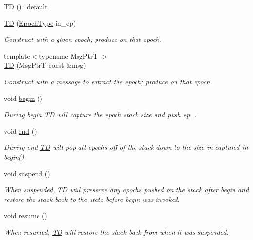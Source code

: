 \begin{DoxyCompactItemize}
\item 
\hyperlink{structvt_1_1ctx_1_1_t_d_a1cb75bb3a0803da9cc471b675aa9124e}{TD} ()=default
\item 
\hyperlink{structvt_1_1ctx_1_1_t_d_ade8d2b390d1b4a484dd9f5f20546bc91}{TD} (\hyperlink{namespacevt_a81d11b28122d43bf9834577e4a06440f}{Epoch\+Type} in\+\_\+ep)
\begin{DoxyCompactList}\small\item\em Construct with a given epoch; produce on that epoch. \end{DoxyCompactList}\item 
{\footnotesize template$<$typename Msg\+PtrT $>$ }\\\hyperlink{structvt_1_1ctx_1_1_t_d_a632c366417b95a168c345cfb17051eeb}{TD} (Msg\+PtrT const \&msg)
\begin{DoxyCompactList}\small\item\em Construct with a message to extract the epoch; produce on that epoch. \end{DoxyCompactList}\item 
void \hyperlink{structvt_1_1ctx_1_1_t_d_a1560e74cce475bbc650f03b91bf6274e}{begin} ()
\begin{DoxyCompactList}\small\item\em During begin {\ttfamily \hyperlink{structvt_1_1ctx_1_1_t_d}{TD}} will capture the epoch stack size and push {\ttfamily ep\+\_\+}. \end{DoxyCompactList}\item 
void \hyperlink{structvt_1_1ctx_1_1_t_d_a84ec814281906256db4ebc71fa2a435a}{end} ()
\begin{DoxyCompactList}\small\item\em During end {\ttfamily \hyperlink{structvt_1_1ctx_1_1_t_d}{TD}} will pop all epochs off of the stack down to the size in captured in {\ttfamily \hyperlink{structvt_1_1ctx_1_1_t_d_a1560e74cce475bbc650f03b91bf6274e}{begin()}} \end{DoxyCompactList}\item 
void \hyperlink{structvt_1_1ctx_1_1_t_d_ab66a4c01265c0c43d95d0084ea8c5ff9}{suspend} ()
\begin{DoxyCompactList}\small\item\em When suspended, {\ttfamily \hyperlink{structvt_1_1ctx_1_1_t_d}{TD}} will preserve any epochs pushed on the stack after begin and restore the stack back to the state before begin was invoked. \end{DoxyCompactList}\item 
void \hyperlink{structvt_1_1ctx_1_1_t_d_a0092946ebad71b2518fa8fa5a7eeb3f2}{resume} ()
\begin{DoxyCompactList}\small\item\em When resumed, {\ttfamily \hyperlink{structvt_1_1ctx_1_1_t_d}{TD}} will restore the stack back from when it was suspended. \end{DoxyCompactList}\end{DoxyCompactItemize}
